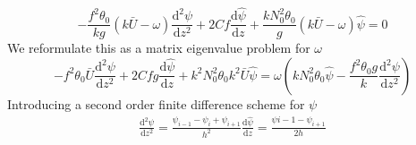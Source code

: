 \begin{equation}
-\frac{f^2\theta_0}{kg}(k\bar{U}-\omega)\frac{\text{d}^2{\psi}}{\text{d}z^2}+2Cf\frac{\text{d}\hat{\psi}}{\text{d}z}+\frac{k N_0^2\theta_0}{g}(k\bar{U}-\omega)\hat{\psi}=0
\end{equation}
We reformulate this as a matrix eigenvalue problem for $\omega$
\begin{equation}
-f^2\theta_0\bar{U}\frac{\text{d}^2{\psi}}{\text{d}z^2}+2Cfg\frac{\text{d}\hat{\psi}}{\text{d}z}+k^2 N_0^2\theta_0k^2\bar{U}\hat{\psi}=\omega \left(kN_0^2\theta_0\hat{\psi}-\frac{f^2\theta_0 g}{k}\frac{\text{d}^2{\psi}}{\text{d}z^2}\right)
\end{equation}
Introducing a second order finite difference scheme for $\psi$
\begin{equation}
	\begin{aligned}
	\frac{\text{d}^2{\psi}}{\text{d}z^2} = \frac{\psi_{i-1} - \psi_i + \psi_{i+1}}{h^2}
	\frac{\text{d}\hat{\psi}}{\text{d}z} = \frac{\psi{i-1} - \psi_{i+1}}{2h}
	\end{aligned}
\end{equation}